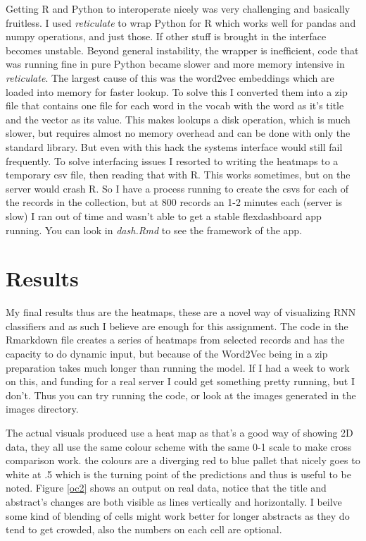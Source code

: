 \documentclass[12pt, a4paper]{article}
\begin{document}
Getting R and Python to interoperate nicely was very challenging and basically fruitless. I used \textit{reticulate} to wrap Python for R which works well for pandas and numpy operations, and just those. If other stuff is brought in the interface becomes unstable. Beyond general instability, the wrapper is inefficient, code that was running fine in pure Python became slower and more memory intensive in \textit{reticulate}. The largest cause of this was the word2vec embeddings which are loaded into memory for faster lookup. To solve this I converted them into a zip file that contains one file for each word in the vocab with the word as it's title and the vector as its value. This makes lookups a disk operation, which is much slower, but requires almost no memory overhead and can be done with only the standard library. But even with this hack the systems interface would still fail frequently. To solve interfacing issues I resorted to writing the heatmaps to a temporary csv file, then reading that with R. This works sometimes, but on the server would crash R. So I have a process running to create the csvs for each of the records in the collection, but at 800 records an 1-2 minutes each (server is slow) I ran out of time and wasn't able to get a stable flexdashboard app running. You can look in \textit{dash.Rmd} to see the framework of the app.

\section*{Results}

My final results thus are the heatmaps, these are a novel way of visualizing RNN classifiers and as such I believe are enough for this assignment. The code in the Rmarkdown file creates a series of heatmaps from selected records and has the capacity to do dynamic input, but because of the Word2Vec being in a zip preparation takes much longer than running the model. If I had a week to work on this, and funding for a real server I could get something pretty running, but I don't. Thus you can try running the code, or look at the images generated in the images directory.

The actual visuals produced use a heat map as that's a good way of showing 2D data, they all use the same colour scheme with the same 0-1 scale to make cross comparison work. the colours are a diverging red to blue pallet that nicely goes to white at .5 which is the turning point of the predictions and thus is useful to be noted. Figure \ref{oc2} shows an output on real data, notice that the title and abstract's changes are both visible as lines vertically and horizontally. I beilve some kind of blending of cells might work better for longer abstracts as they do tend to get crowded, also the numbers on each cell are optional.
\end{document}
